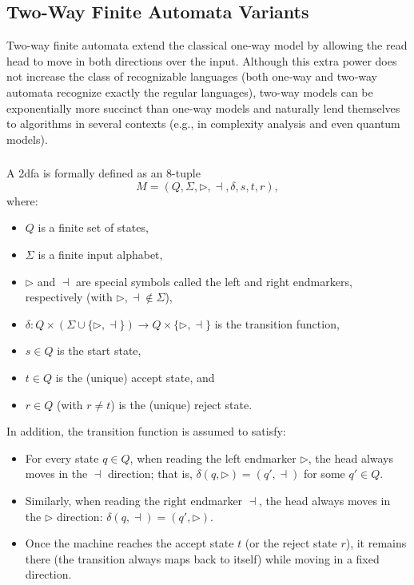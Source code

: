 \subsection{Two-Way Finite Automata Variants}
\label{subsec:two-way-variants}

Two-way finite automata extend the classical one‐way model by allowing the read head to move in both directions over the input. Although this extra power does not increase the class of recognizable languages (both one‐way and two‐way automata recognize exactly the regular languages), two-way models can be exponentially more succinct than one-way models \cite{sakoda1978nfas, kozen1997automata} and naturally lend themselves to algorithms in several contexts (e.g., in complexity analysis and even quantum models).


\subsubsection{}
\label{subsubsec:2dfa}

\begin{definition}
A \gls{2dfa} is formally defined as an 8-tuple 
\[
M = (Q, \Sigma, \triangleright, \dashv, \delta, s, t, r),
\]
where:
\begin{itemize}
  \item \(Q\) is a finite set of states,
  \item \(\Sigma\) is a finite input alphabet,
  \item \(\triangleright\) and \(\dashv\) are special symbols called the left and right endmarkers, respectively (with \(\triangleright,\dashv \notin \Sigma\)),
  \item \(\delta: Q \times (\Sigma \cup \{\triangleright, \dashv\}) \to Q \times \{\triangleright,\dashv\}\) is the transition function,
  \item \(s\in Q\) is the start state,
  \item \(t\in Q\) is the (unique) accept state, and
  \item \(r\in Q\) (with \(r\neq t\)) is the (unique) reject state.
\end{itemize}
In addition, the transition function is assumed to satisfy:
\begin{itemize}
  \item For every state \(q\in Q\), when reading the left endmarker \(\triangleright\), the head always moves in the \(\dashv\) direction; that is, \(\delta(q,\triangleright) = (q', \dashv)\) for some \(q'\in Q\).
  \item Similarly, when reading the right endmarker \(\dashv\), the head always moves in the \(\triangleright\) direction: \(\delta(q,\dashv) = (q', \triangleright)\).
  \item Once the machine reaches the accept state \(t\) (or the reject state \(r\)), it remains there (the transition always maps back to itself) while moving in a fixed direction.
\end{itemize}
\end{definition}

